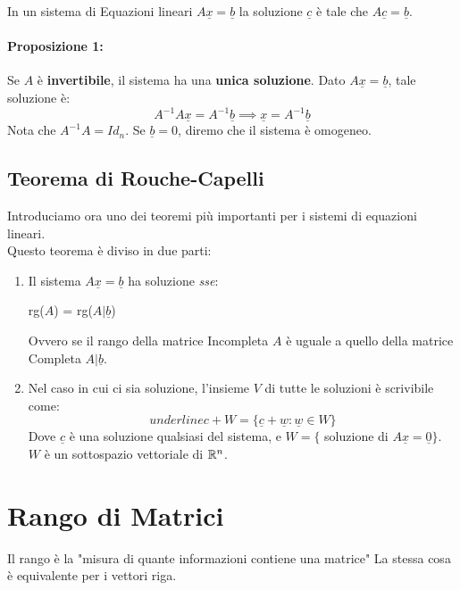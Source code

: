 In un sistema di Equazioni lineari $A\underline{x} = \underline{b}$ la soluzione $\underline{c}$ è tale che $A\underline{c}=\underline{b}$.

\paragraph{Proposizione 1:} Se $A$ è \textbf{invertibile}, il sistema ha una \textbf{unica soluzione}.
Dato $A\underline{x}=\underline{b}$, tale soluzione è:
\[A^{-1} A \underline{x} = A^{-1} \underline{b} \implies \underline{x} = A^{-1}\underline{b}\]
Nota che $A^{-1} A = Id_n$. Se $\underline{b}=0$, diremo che il sistema è omogeneo.

\subsection{Teorema di Rouche-Capelli}
Introduciamo ora uno dei teoremi più importanti per i sistemi di equazioni lineari.
\\Questo teorema è diviso in due parti:

\begin{enumerate}
	\item Il sistema $A\underline{x}=\underline{b}$ ha soluzione \emph{sse}:
	      \begin{center}
		      rg($A$) = rg($A|\underline{b}$)
	      \end{center}
	      Ovvero se il rango della matrice Incompleta $A$ è uguale a quello della matrice Completa $A|\underline{b}$.
	\item Nel caso in cui ci sia soluzione, l'insieme $V$ di tutte le soluzioni è scrivibile come:
	      \[ underline{c} + W = \{ \underline{c} + \underline{w} : \underline{w} \in W\} \]
	      Dove $\underline{c}$ è una soluzione qualsiasi del sistema, e $W= \{$ soluzione di $A\underline{x} = \underline{0} \}$.
	      $W$ è un sottospazio vettoriale di $\mathbb{R}^n$.
\end{enumerate}

\section{Rango di Matrici}
Il rango è la "misura di quante informazioni contiene una matrice"
La stessa cosa è equivalente per i vettori riga.

